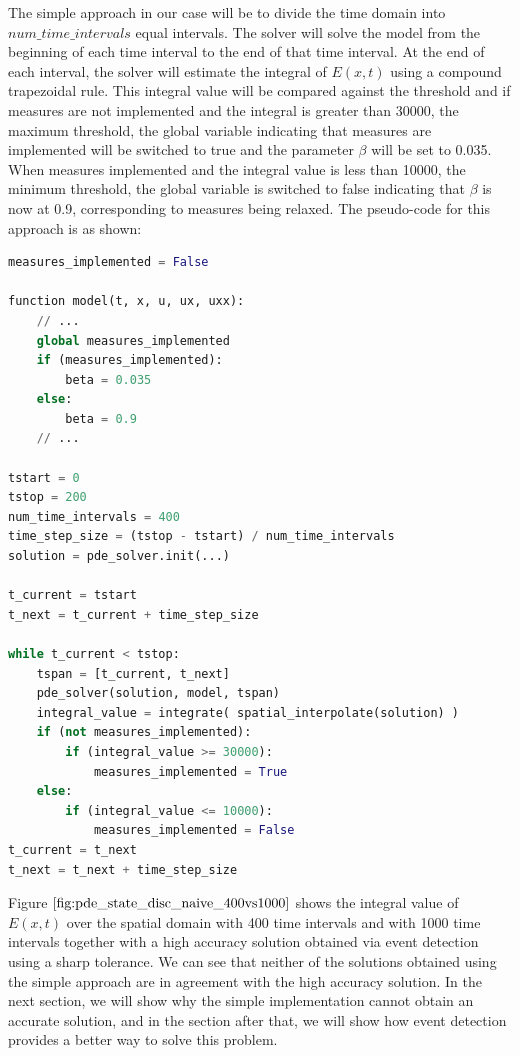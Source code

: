 \documentclass{article}
\begin{document}
The simple approach in our case will be to divide the time domain into $num\_time\_intervals$ equal intervals. The solver will solve the model from the beginning of each time interval to the end of that time interval. At the end of each interval, the solver will estimate the integral of $E(x, t)$ using a compound trapezoidal rule. This integral value will be compared against the threshold and if measures are not implemented and the integral is greater than 30000, the maximum threshold, the global variable indicating that measures are implemented will be switched to true and the parameter $\beta$ will be set to 0.035. When measures implemented and the integral value is less than 10000, the minimum threshold, the global variable is switched to false indicating that $\beta$ is now at 0.9, corresponding to measures being relaxed. The pseudo-code for this approach is as shown:

\begin{minipage}{\linewidth}
\begin{lstlisting}[language=Python]
measures_implemented = False

function model(t, x, u, ux, uxx):
	// ...
	global measures_implemented
	if (measures_implemented):
		beta = 0.035
	else:
		beta = 0.9
	// ...

tstart = 0
tstop = 200
num_time_intervals = 400
time_step_size = (tstop - tstart) / num_time_intervals
solution = pde_solver.init(...)

t_current = tstart
t_next = t_current + time_step_size

while t_current < tstop:
	tspan = [t_current, t_next]
	pde_solver(solution, model, tspan)
	integral_value = integrate( spatial_interpolate(solution) )
	if (not measures_implemented):
		if (integral_value >= 30000): 
			measures_implemented = True
	else:
		if (integral_value <= 10000):
			measures_implemented = False
t_current = t_next
t_next = t_next + time_step_size
\end{lstlisting}
\end{minipage} 

Figure $\ref{fig:pde_state_disc_naive_400vs1000}$ shows the integral value of $E(x, t)$ over the spatial domain with 400 time intervals and with 1000 time intervals together with a high accuracy solution obtained via event detection using a sharp tolerance. We can see that neither of the solutions obtained using the simple approach are in agreement with the high accuracy solution. In the next section, we will show why the simple implementation cannot obtain an accurate solution, and in the section after that, we will show how event detection provides a better way to solve this problem.
\end{document}
